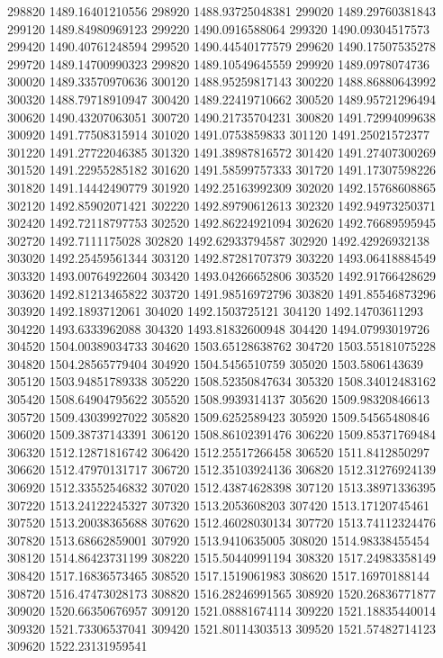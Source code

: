 {298820 1489.16401210556
298920 1488.93725048381
299020 1489.29760381843
299120 1489.84980969123
299220 1490.0916588064
299320 1490.09304517573
299420 1490.40761248594
299520 1490.44540177579
299620 1490.17507535278
299720 1489.14700990323
299820 1489.10549645559
299920 1489.0978074736
300020 1489.33570970636
300120 1488.95259817143
300220 1488.86880643992
300320 1488.79718910947
300420 1489.22419710662
300520 1489.95721296494
300620 1490.43207063051
300720 1490.21735704231
300820 1491.72994099638
300920 1491.77508315914
301020 1491.0753859833
301120 1491.25021572377
301220 1491.27722046385
301320 1491.38987816572
301420 1491.27407300269
301520 1491.22955285182
301620 1491.58599757333
301720 1491.17307598226
301820 1491.14442490779
301920 1492.25163992309
302020 1492.15768608865
302120 1492.85902071421
302220 1492.89790612613
302320 1492.94973250371
302420 1492.72118797753
302520 1492.86224921094
302620 1492.76689595945
302720 1492.7111175028
302820 1492.62933794587
302920 1492.42926932138
303020 1492.25459561344
303120 1492.87281707379
303220 1493.06418884549
303320 1493.00764922604
303420 1493.04266652806
303520 1492.91766428629
303620 1492.81213465822
303720 1491.98516972796
303820 1491.85546873296
303920 1492.1893712061
304020 1492.1503725121
304120 1492.14703611293
304220 1493.6333962088
304320 1493.81832600948
304420 1494.07993019726
304520 1504.00389034733
304620 1503.65128638762
304720 1503.55181075228
304820 1504.28565779404
304920 1504.5456510759
305020 1503.5806143639
305120 1503.94851789338
305220 1508.52350847634
305320 1508.34012483162
305420 1508.64904795622
305520 1508.9939314137
305620 1509.98320846613
305720 1509.43039927022
305820 1509.6252589423
305920 1509.54565480846
306020 1509.38737143391
306120 1508.86102391476
306220 1509.85371769484
306320 1512.12871816742
306420 1512.25517266458
306520 1511.8412850297
306620 1512.47970131717
306720 1512.35103924136
306820 1512.31276924139
306920 1512.33552546832
307020 1512.43874628398
307120 1513.38971336395
307220 1513.24122245327
307320 1513.2053608203
307420 1513.17120745461
307520 1513.20038365688
307620 1512.46028030134
307720 1513.74112324476
307820 1513.68662859001
307920 1513.9410635005
308020 1514.98338455454
308120 1514.86423731199
308220 1515.50440991194
308320 1517.24983358149
308420 1517.16836573465
308520 1517.1519061983
308620 1517.16970188144
308720 1516.47473028173
308820 1516.28246991565
308920 1520.26836771877
309020 1520.66350676957
309120 1521.08881674114
309220 1521.18835440014
309320 1521.73306537041
309420 1521.80114303513
309520 1521.57482714123
309620 1522.23131959541
}
